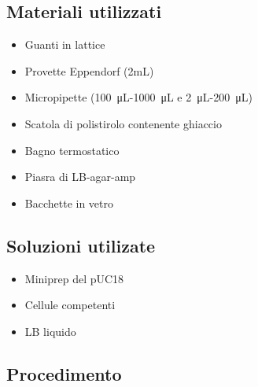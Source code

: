 \subsection{Materiali utilizzati}

\begin{itemize}
	\item Guanti in lattice
	\item Provette Eppendorf (2mL)
	\item Micropipette (\SI{100}{\micro\liter}-\SI{1000}{\micro\liter} e \SI{2}{\micro\liter}-\SI{200}{\micro\liter})
	\item Scatola di polistirolo contenente ghiaccio
	\item Bagno termostatico
	\item Piasra di LB-agar-amp
	\item Bacchette in vetro
\end{itemize}

\subsection{Soluzioni utilizate}

\begin{itemize}
	\item Miniprep del pUC18
	\item Cellule competenti
	\item LB liquido
\end{itemize}

\subsection{Procedimento}

